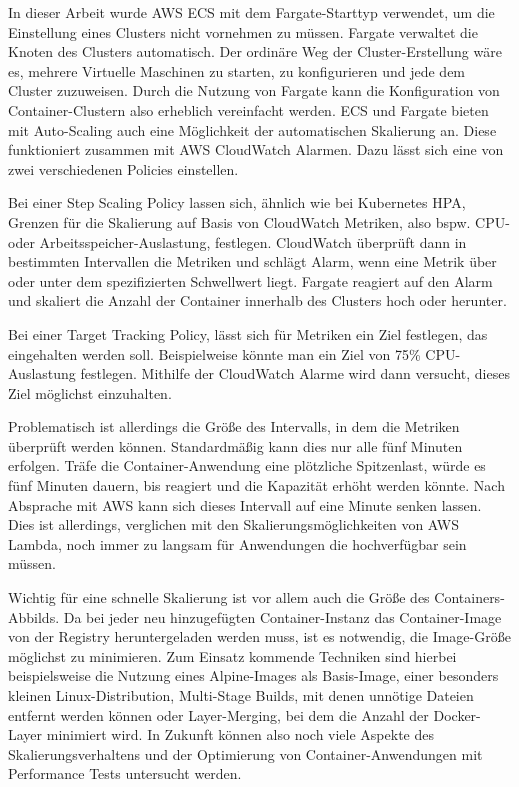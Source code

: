 In dieser Arbeit wurde AWS ECS mit dem Fargate-Starttyp verwendet, um die Einstellung eines Clusters nicht vornehmen zu müssen. Fargate verwaltet die Knoten des Clusters automatisch. Der ordinäre Weg der Cluster-Erstellung wäre es, mehrere Virtuelle Maschinen zu starten, zu konfigurieren und jede dem Cluster zuzuweisen. Durch die Nutzung von Fargate kann die Konfiguration von Container-Clustern also erheblich vereinfacht werden. ECS und Fargate bieten mit Auto-Scaling auch eine Möglichkeit der automatischen Skalierung an. Diese funktioniert zusammen mit AWS CloudWatch Alarmen. Dazu lässt sich eine von zwei verschiedenen Policies einstellen.

Bei einer Step Scaling Policy lassen sich, ähnlich wie bei Kubernetes HPA, Grenzen für die Skalierung auf Basis von CloudWatch Metriken, also bspw. CPU- oder Arbeitsspeicher-Auslastung, festlegen. CloudWatch überprüft dann in bestimmten Intervallen die Metriken und schlägt Alarm, wenn eine Metrik über oder unter dem spezifizierten Schwellwert liegt. Fargate reagiert auf den Alarm und skaliert die Anzahl der Container innerhalb des Clusters hoch oder herunter. 

Bei einer Target Tracking Policy, lässt sich für Metriken ein Ziel festlegen, das eingehalten werden soll. Beispielweise könnte man ein Ziel von 75\% CPU-Auslastung festlegen. Mithilfe der CloudWatch Alarme wird dann versucht, dieses Ziel möglichst einzuhalten. 

Problematisch ist allerdings die Größe des Intervalls, in dem die Metriken überprüft werden können. Standardmäßig kann dies nur alle fünf Minuten erfolgen. Träfe die Container-Anwendung eine plötzliche Spitzenlast, würde es fünf Minuten dauern, bis reagiert und die Kapazität erhöht werden könnte. Nach Absprache mit AWS kann sich dieses Intervall auf eine Minute senken lassen. Dies ist allerdings, verglichen mit den Skalierungsmöglichkeiten von AWS Lambda, noch immer zu langsam für Anwendungen die hochverfügbar sein müssen.

Wichtig für eine schnelle Skalierung ist vor allem auch die Größe des Containers-Abbilds. Da bei jeder neu hinzugefügten Container-Instanz das Container-Image von der Registry heruntergeladen werden muss, ist es notwendig, die Image-Größe möglichst zu minimieren. Zum Einsatz kommende Techniken sind hierbei beispielsweise die Nutzung eines Alpine-Images als Basis-Image, einer besonders kleinen Linux-Distribution, Multi-Stage Builds, mit denen unnötige Dateien entfernt werden können oder Layer-Merging, bei dem die Anzahl der Docker-Layer minimiert wird.
In Zukunft können also noch viele Aspekte des Skalierungsverhaltens und der Optimierung von Container-Anwendungen mit Performance Tests untersucht werden. 

